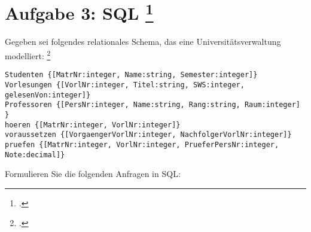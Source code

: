 \documentclass{bschlangaul-aufgabe}
\begin{document}

\section{Aufgabe 3: SQL
\footcite[Thema 2 Aufgabe 3]{66113:2003:03}
}

Gegeben sei folgendes relationales Schema, das eine
Universitätsverwaltung modelliert:
\footcite[Aufgabe 3: SQL]{db:pu:2}

\begin{verbatim}
Studenten {[MatrNr:integer, Name:string, Semester:integer]}
Vorlesungen {[VorlNr:integer, Titel:string, SWS:integer, gelesenVon:integer]}
Professoren {[PersNr:integer, Name:string, Rang:string, Raum:integer] }
hoeren {[MatrNr:integer, VorlNr:integer]}
voraussetzen {[VorgaengerVorlNr:integer, NachfolgerVorlNr:integer]}
pruefen {[MatrNr:integer, VorlNr:integer, PrueferPersNr:integer, Note:decimal]}
\end{verbatim}

\noindent
Formulieren Sie die folgenden Anfragen in SQL:
\end{document}
